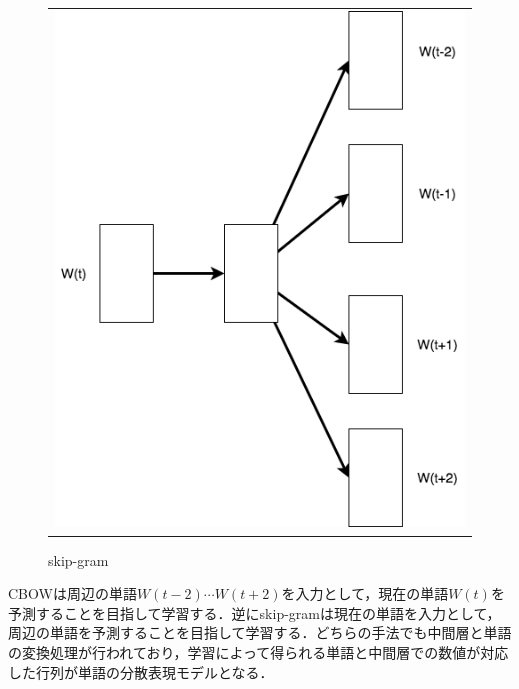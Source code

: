 \begin{figure}[htbp]
\begin{center}
\begin{tabular}{c}
\begin{minipage}{0.5\textwidth}
\begin{center}
  			\caption{CBOW}
 	 		\label{Fig:CBOW}
 		 	\vspace{-10pt}
 		\end{center}
		\end{minipage}
      		\begin{minipage}{0.5\textwidth}
       		 \begin{center}
 	 		\includegraphics[width=\hsize]{../images/2.Related_Work/skip-gram.png}
  			\caption{skip-gram}
 	 		\label{Fig:skip-gram}
 		 	\vspace{-10pt}
 		\end{center}
		\end{minipage}
	\end{tabular}
	 \end{center}
\end{figure}

CBOWは周辺の単語$W(t-2) \cdots  W(t+2)$を入力として，現在の単語$W(t)$を予測することを目指して学習する．逆にskip-gramは現在の単語を入力として，周辺の単語を予測することを目指して学習する．どちらの手法でも中間層と単語の変換処理が行われており，学習によって得られる単語と中間層での数値が対応した行列が単語の分散表現モデルとなる．

